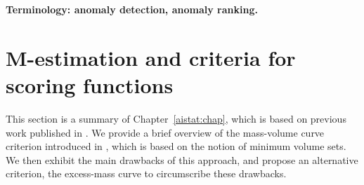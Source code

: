 \begin{remark}{\bf Terminology: anomaly detection, anomaly ranking.\\}



\end{remark}


\section{M-estimation and criteria for scoring functions}
\label{resume:scoring}

This section is a summary of Chapter~\ref{aistat:chap}, which is based on previous work published in \cite{AISTAT15}. We provide a brief overview of the mass-volume curve criterion introduced in \cite{CLEM13}, which is based on the notion of minimum volume sets. We then exhibit the main drawbacks of this approach, and propose an alternative criterion, the excess-mass curve to circumscribe these drawbacks. 

